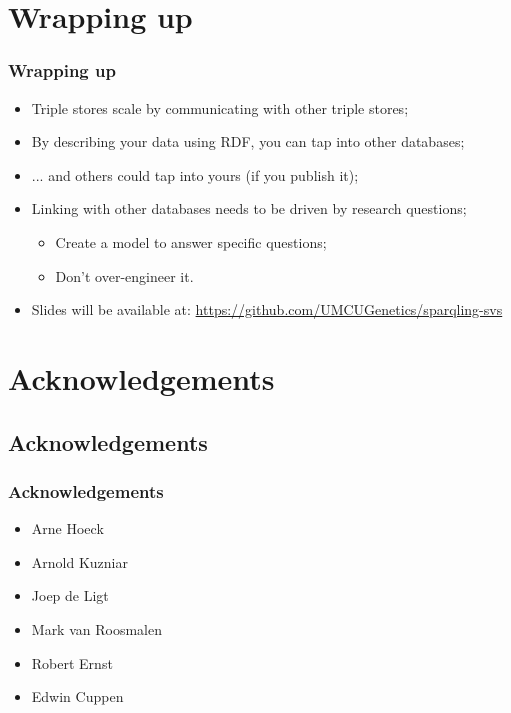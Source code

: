 \documentclass[11pt,aspectratio=169]{beamer} %
\begin{document}
\section{Wrapping up}

\begin{frame}
  \frametitle{Wrapping up}
  \begin{itemize}
    \item Triple stores scale by communicating with other triple stores;
    \pause
    \item By describing your data using RDF, you can tap into other databases;
    \pause
    \item ... and others could tap into yours (if you publish it);
    \pause
    \item Linking with other databases needs to be driven by research questions;
      \begin{itemize}
        \item Create a model to answer specific questions;
        \pause
        \item Don't over-engineer it.
      \end{itemize}
      \pause
    \item Slides will be available at: \url{https://github.com/UMCUGenetics/sparqling-svs}
  \end{itemize}
\end{frame}

\section{Acknowledgements}

\subsection{Acknowledgements}

\begin{frame}
  \frametitle{Acknowledgements}
  \begin{itemize}
    \item[] Arne Hoeck
    \item[] Arnold Kuzniar
    \item[] Joep de Ligt
    \item[] Mark van Roosmalen
    \item[] Robert Ernst
    \item[] Edwin Cuppen
  \end{itemize}
\end{frame}
\end{document}
